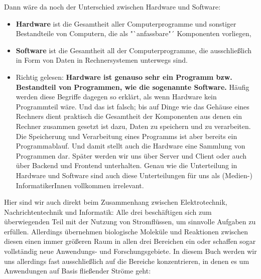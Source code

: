 Dann wäre da noch der Unterschied zwischen Hardware und Software:

\begin{itemize}
	\item \textbf{Hardware} ist die Gesamtheit aller Computerprogramme und sonstiger Bestandteile von Computern, die als "`anfassbare"´ Komponenten vorliegen,
	
	\item \textbf{Software} ist die Gesamtheit all der Computerprogramme, die ausschließlich in Form von Daten in Rechnersystemen unterwegs sind. 
	
	\item Richtig gelesen: \textbf{Hardware ist genauso sehr ein Programm bzw. Bestandteil von Programmen, wie die sogenannte Software.} Häufig werden diese Begriffe dagegen so erklärt, als wenn Hardware kein Programmteil wäre. Und das ist falsch; bis auf Dinge wie das Gehäuse eines Rechners dient praktisch die Gesamtheit der Komponenten aus denen ein Rechner zusammen gesetzt ist dazu, Daten zu speichern und zu verarbeiten. Die Speicherung und Verarbeitung eines Programms ist aber bereits ein Programmablauf. Und damit stellt auch die Hardware eine Sammlung von Programmen dar. Später werden wir uns über Server und Client oder auch über Backend und Frontend unterhalten. Genau wie die Unterteilung in Hardware und Software sind auch diese Unterteilungen für uns als (Medien-)\\
	InformatikerInnen vollkommen irrelevant.\\	
\end{itemize}

Hier sind wir auch direkt beim Zusammenhang zwischen Elektrotechnik, Nachrichtentechnik und Informatik: Alle drei beschäftigen sich zum\\überwiegenden Teil mit der Nutzung von Stromflüssen, um sinnvolle Aufgaben zu erfüllen. Allerdings übernehmen biologische Moleküle und Reaktionen zwischen diesen einen immer größeren Raum in allen drei Bereichen ein oder schaffen sogar vollständig neue Anwendungs- und Forschungsgebiete. In diesem Buch werden wir uns allerdings fast ausschließlich auf die Bereiche konzentrieren, in denen es um Anwendungen auf Basis fließender Ströme geht:\\

